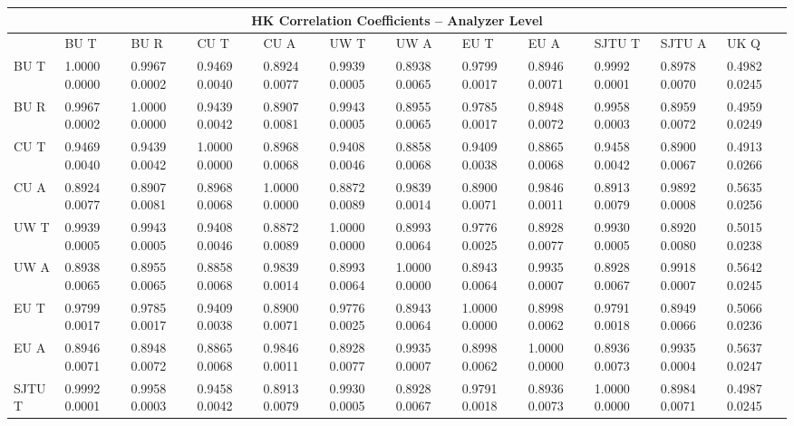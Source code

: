 \begin{landscape}
\begin{table}
\small
\centering
\renewcommand{\arraystretch}{1.5}
\begin{tabularx}{1\linewidth}{@{\extracolsep{\fill}}lXXXXXXXXXXX}
  \toprule
  	\multicolumn{12}{c}{{\normalsize HK Correlation Coefficients -- Analyzer Level}} \\
  \midrule
  	       & BU T & BU R & CU T & CU A & UW T & UW A & EU T & EU A & SJTU T & SJTU A & UK Q \\
  \midrule
	BU T   & 1.0000 0.0000 & 0.9967 0.0002 & 0.9469 0.0040 & 0.8924 0.0077 & 0.9939 0.0005 & 0.8938 0.0065 & 0.9799 0.0017 & 0.8946 0.0071 & 0.9992 0.0001 & 0.8978 0.0070 & 0.4982 0.0245  \\
	BU R   & 0.9967 0.0002 & 1.0000 0.0000 & 0.9439 0.0042 & 0.8907 0.0081 & 0.9943 0.0005 & 0.8955 0.0065 & 0.9785 0.0017 & 0.8948 0.0072 & 0.9958 0.0003 & 0.8959 0.0072 & 0.4959 0.0249  \\
	CU T   & 0.9469 0.0040 & 0.9439 0.0042 & 1.0000 0.0000 & 0.8968 0.0068 & 0.9408 0.0046 & 0.8858 0.0068 & 0.9409 0.0038 & 0.8865 0.0068 & 0.9458 0.0042 & 0.8900 0.0067 & 0.4913 0.0266  \\
	CU A   & 0.8924 0.0077 & 0.8907 0.0081 & 0.8968 0.0068 & 1.0000 0.0000 & 0.8872 0.0089 & 0.9839 0.0014 & 0.8900 0.0071 & 0.9846 0.0011 & 0.8913 0.0079 & 0.9892 0.0008 & 0.5635 0.0256  \\
	UW T   & 0.9939 0.0005 & 0.9943 0.0005 & 0.9408 0.0046 & 0.8872 0.0089 & 1.0000 0.0000 & 0.8993 0.0064 & 0.9776 0.0025 & 0.8928 0.0077 & 0.9930 0.0005 & 0.8920 0.0080 & 0.5015 0.0238  \\
	UW A   & 0.8938 0.0065 & 0.8955 0.0065 & 0.8858 0.0068 & 0.9839 0.0014 & 0.8993 0.0064 & 1.0000 0.0000 & 0.8943 0.0064 & 0.9935 0.0007 & 0.8928 0.0067 & 0.9918 0.0007 & 0.5642 0.0245  \\
	EU T   & 0.9799 0.0017 & 0.9785 0.0017 & 0.9409 0.0038 & 0.8900 0.0071 & 0.9776 0.0025 & 0.8943 0.0064 & 1.0000 0.0000 & 0.8998 0.0062 & 0.9791 0.0018 & 0.8949 0.0066 & 0.5066 0.0236  \\
	EU A   & 0.8946 0.0071 & 0.8948 0.0072 & 0.8865 0.0068 & 0.9846 0.0011 & 0.8928 0.0077 & 0.9935 0.0007 & 0.8998 0.0062 & 1.0000 0.0000 & 0.8936 0.0073 & 0.9935 0.0004 & 0.5637 0.0247  \\
	SJTU T & 0.9992 0.0001 & 0.9958 0.0003 & 0.9458 0.0042 & 0.8913 0.0079 & 0.9930 0.0005 & 0.8928 0.0067 & 0.9791 0.0018 & 0.8936 0.0073 & 1.0000 0.0000 & 0.8984 0.0071 & 0.4987 0.0245  \\

\end{tabularx}
\end{table}
\end{landscape}

